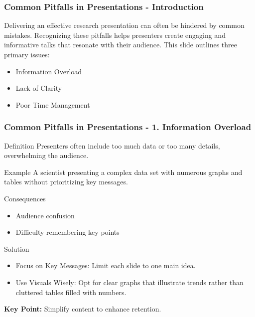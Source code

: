 \documentclass[aspectratio=169]{beamer}
\begin{document}
\begin{frame}[fragile]
    \frametitle{Common Pitfalls in Presentations - Introduction}
    Delivering an effective research presentation can often be hindered by common mistakes. 
    Recognizing these pitfalls helps presenters create engaging and informative talks that resonate with their audience. 
    This slide outlines three primary issues:
    \begin{itemize}
        \item Information Overload
        \item Lack of Clarity
        \item Poor Time Management
    \end{itemize}
\end{frame}

\begin{frame}[fragile]
    \frametitle{Common Pitfalls in Presentations - 1. Information Overload}
    \begin{block}{Definition}
        Presenters often include too much data or too many details, overwhelming the audience.
    \end{block}
    \begin{exampleblock}{Example}
        A scientist presenting a complex data set with numerous graphs and tables without prioritizing key messages.
    \end{exampleblock}
    \begin{block}{Consequences}
        \begin{itemize}
            \item Audience confusion
            \item Difficulty remembering key points
        \end{itemize}
    \end{block}
    \begin{block}{Solution}
        \begin{itemize}
            \item Focus on Key Messages: Limit each slide to one main idea.
            \item Use Visuals Wisely: Opt for clear graphs that illustrate trends rather than cluttered tables filled with numbers.
        \end{itemize}
    \end{block}
    \textbf{Key Point:} Simplify content to enhance retention.
\end{frame}
\end{document}
